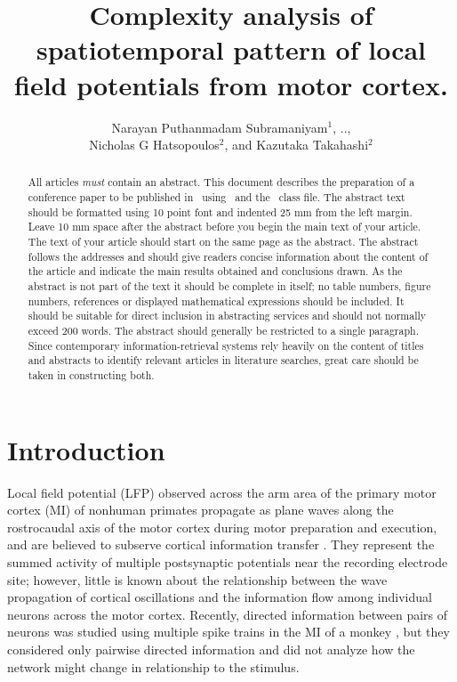 \documentclass[a4paper]{jpconf}
\begin{document}
\title{Complexity analysis of spatiotemporal pattern of local field potentials from motor cortex.}

\author{Narayan Puthanmadam Subramaniyam$^1$, .., \\
Nicholas G Hatsopoulos$^2$, and Kazutaka Takahashi$^2$}

\address{1. Finland\\
2. Department of Organismal Biology and Anatomy, University of Chicago, Chicago, IL 60615, USA}


\begin{abstract}
All articles {\it must} contain an abstract. This document describes the  preparation of a conference paper to be published in \jpcs\ using \LaTeXe\ and the \cls\ class file. The abstract text should be formatted using 10 point font and indented 25 mm from the left margin. Leave 10 mm space after the abstract before you begin the main text of your article. The text of your article should start on the same page as the abstract. The abstract follows the addresses and should give readers concise information about the content of the article and indicate the main results obtained and conclusions drawn. As the abstract is not part of the text it should be complete in itself; no table numbers, figure numbers, references or displayed mathematical expressions should be included. It should be suitable for direct inclusion in abstracting services and should not normally exceed 200 words. The abstract should generally be restricted to a single paragraph. Since contemporary information-retrieval systems rely heavily on the content of titles and abstracts to identify relevant articles in literature searches, great care should be taken in constructing both.
\end{abstract}

\section{Introduction}

Local field potential (LFP)
observed across the arm area of the primary motor cortex (MI) of
nonhuman primates propagate as plane waves along the rostrocaudal
axis of the motor cortex during motor preparation and execution, and are
believed to subserve cortical information transfer
\cite{ref:Rubino}. They represent the summed activity of multiple
postsynaptic potentials near the recording electrode site;
however, little is known about the relationship between the wave
propagation of cortical oscillations and the information flow
among individual neurons across the motor cortex. Recently, directed
information between pairs of neurons was studied using multiple
spike trains in the MI of a monkey \cite{ref:Chris2011}, but they
considered only pairwise directed information and did not analyze
how the network might change in relationship to the stimulus.
\end{document}
